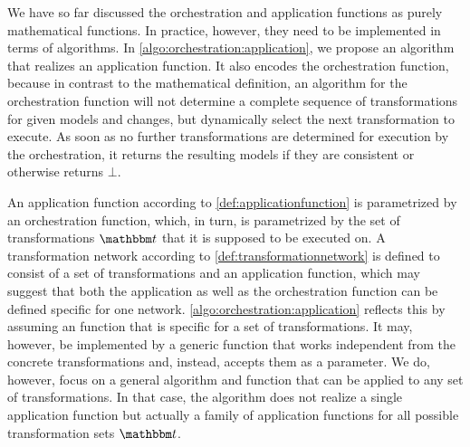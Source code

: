 We have so far discussed the orchestration and application functions as purely mathematical functions.
In practice, however, they need to be implemented in terms of algorithms.
In \autoref{algo:orchestration:application}, we propose an algorithm that realizes an application function.
It also encodes the orchestration function, because in contrast to the mathematical definition, an algorithm for the orchestration function will not determine a complete sequence of transformations for given models and changes, but dynamically select the next transformation to execute.
As soon as no further transformations are determined for execution by the orchestration, it returns the resulting models if they are consistent or otherwise returns $\bot$.

An application function according to \autoref{def:applicationfunction} is parametrized by an orchestration function, which, in turn, is parametrized by the set of transformations $\transformationset{T}$ that it is supposed to be executed on.
A transformation network according to \autoref{def:transformationnetwork} is defined to consist of a set of transformations and an application function, which may suggest that both the application as well as the orchestration function can be defined specific for one network.
\autoref{algo:orchestration:application} reflects this by assuming an  function that is specific for a set of transformations.
It may, however, be implemented by a generic function that works independent from the concrete transformations and, instead, accepts them as a parameter.
We do, however, focus on a general algorithm and  function that can be applied to any set of transformations.
In that case, the algorithm does not realize a single application function but actually a family of application functions for all possible transformation sets $\transformationset{T}$.


